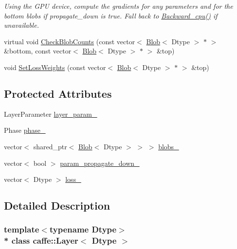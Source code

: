 \begin{DoxyCompactItemize}
\begin{DoxyCompactList}\small\item\em Using the G\+PU device, compute the gradients for any parameters and for the bottom blobs if propagate\+\_\+down is true. Fall back to \hyperlink{classcaffe_1_1Layer_a64d15855f882af4b82e83fa993c4e7c6}{Backward\+\_\+cpu()} if unavailable. \end{DoxyCompactList}\item 
virtual void \hyperlink{classcaffe_1_1Layer_adaa95e30dff155409a25ffcb5c8c885e}{Check\+Blob\+Counts} (const vector$<$ \hyperlink{classcaffe_1_1Blob}{Blob}$<$ Dtype $>$ $\ast$ $>$ \&bottom, const vector$<$ \hyperlink{classcaffe_1_1Blob}{Blob}$<$ Dtype $>$ $\ast$ $>$ \&top)
\item 
void \hyperlink{classcaffe_1_1Layer_a8bd62d1505dd35d6a3a25954ae9e6014}{Set\+Loss\+Weights} (const vector$<$ \hyperlink{classcaffe_1_1Blob}{Blob}$<$ Dtype $>$ $\ast$ $>$ \&top)
\end{DoxyCompactItemize}
\subsection*{Protected Attributes}
\begin{DoxyCompactItemize}
\item 
Layer\+Parameter \hyperlink{classcaffe_1_1Layer_a7ed12bb2df25c887e41d7ea9557fc701}{layer\+\_\+param\+\_\+}
\item 
Phase \hyperlink{classcaffe_1_1Layer_a1d04ad7f595a82a1c811f102d68b8a19}{phase\+\_\+}
\item 
vector$<$ shared\+\_\+ptr$<$ \hyperlink{classcaffe_1_1Blob}{Blob}$<$ Dtype $>$ $>$ $>$ \hyperlink{classcaffe_1_1Layer_a8073fcf2c139b47eb99ce71b346b1321}{blobs\+\_\+}
\item 
vector$<$ bool $>$ \hyperlink{classcaffe_1_1Layer_acd4a05def9ff3b42ad72404210613ef7}{param\+\_\+propagate\+\_\+down\+\_\+}
\item 
vector$<$ Dtype $>$ \hyperlink{classcaffe_1_1Layer_af6d347229a139500994e7a926c680486}{loss\+\_\+}
\end{DoxyCompactItemize}


\subsection{Detailed Description}
\subsubsection*{template$<$typename Dtype$>$\\*
class caffe\+::\+Layer$<$ Dtype $>$}

